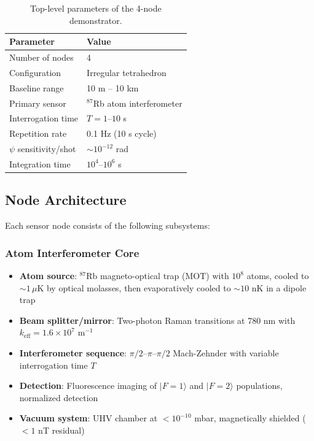 \documentclass[12pt,a4paper]{article}
\theoremstyle{remark}
\begin{document}
\begin{table}[H]
\centering
\begin{tabular}{ll}
\toprule
\textbf{Parameter} & \textbf{Value} \\
\midrule
Number of nodes & 4 \\
Configuration & Irregular tetrahedron \\
Baseline range & 10 m -- 10 km \\
Primary sensor & $^{87}$Rb atom interferometer \\
Interrogation time & $T = 1$--$10$ s \\
Repetition rate & 0.1 Hz (10 s cycle) \\
$\psi$ sensitivity/shot & $\sim 10^{-12}$ rad \\
Integration time & $10^4$--$10^6$ s \\
\bottomrule
\end{tabular}
\caption{Top-level parameters of the 4-node demonstrator.}
\label{tab:demonstrator-params}
\end{table}

\subsection{Node Architecture}\label{sec:node-architecture}

Each sensor node consists of the following subsystems:

\subsubsection{Atom Interferometer Core}

\begin{itemize}
\item \textbf{Atom source}: $^{87}$Rb magneto-optical trap (MOT) with
$10^8$ atoms, cooled to $\sim 1\,\mu$K by optical molasses, then
evaporatively cooled to $\sim 10$ nK in a dipole trap
\item \textbf{Beam splitter/mirror}: Two-photon Raman transitions at 780 nm
with $k_{\text{eff}} = 1.6 \times 10^7$ m$^{-1}$
\item \textbf{Interferometer sequence}: $\pi/2$--$\pi$--$\pi/2$
Mach-Zehnder with variable interrogation time $T$
\item \textbf{Detection}: Fluorescence imaging of $|F=1\rangle$ and
$|F=2\rangle$ populations, normalized detection
\item \textbf{Vacuum system}: UHV chamber at $< 10^{-10}$ mbar,
magnetically shielded ($< 1$ nT residual)
\end{itemize}
\end{document}
